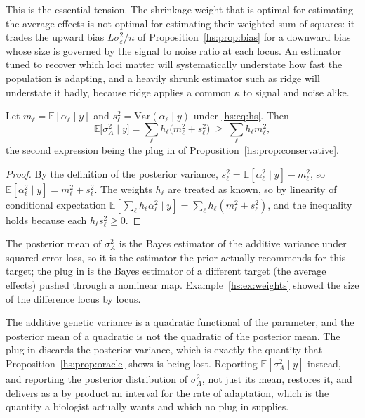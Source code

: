 This is the essential tension. The shrinkage weight that is optimal for estimating the average effects is not optimal for estimating their weighted sum of squares: it trades the upward bias $L\sigma^2_\varepsilon/n$ of Proposition~\ref{hs:prop:bias} for a downward bias whose size is governed by the signal to noise ratio at each locus. An estimator tuned to recover which loci matter will systematically understate how fast the population is adapting, and a heavily shrunk estimator such as ridge will understate it badly, because ridge applies a common $\kappa$ to signal and noise alike.

\begin{proposition}
\label{hs:prop:posterior}
Let $m_\ell = \mathbb{E}[\alpha_\ell\mid y]$ and $s^2_\ell = \mathrm{Var}(\alpha_\ell \mid y)$ under \eqref{hs:eq:hs}. Then
\[
\mathbb{E}\big[\sigma^2_A \mid y\big] = \sum_\ell h_\ell \big(m_\ell^2 + s^2_\ell\big)
\ \ge\ \sum_\ell h_\ell m_\ell^2 ,
\]
the second expression being the plug in of Proposition~\ref{hs:prop:conservative}.
\end{proposition}

\begin{proof}
By the definition of the posterior variance, $s^2_\ell = \mathbb{E}[\alpha_\ell^2\mid y] - m_\ell^2$, so $\mathbb{E}[\alpha_\ell^2\mid y] = m_\ell^2 + s_\ell^2$. The weights $h_\ell$ are treated as known, so by linearity of conditional expectation $\mathbb{E}[\sum_\ell h_\ell\alpha_\ell^2\mid y] = \sum_\ell h_\ell(m_\ell^2+s_\ell^2)$, and the inequality holds because each $h_\ell s^2_\ell \ge 0$.
\end{proof}

The posterior mean of $\sigma^2_A$ is the Bayes estimator of the additive variance under squared error loss, so it is the estimator the prior actually recommends for this target; the plug in is the Bayes estimator of a different target (the average effects) pushed through a nonlinear map. Example~\ref{hs:ex:weights} showed the size of the difference locus by locus.

The additive genetic variance is a quadratic functional of the parameter, and the posterior mean of a quadratic is not the quadratic of the posterior mean. The plug in discards the posterior variance, which is exactly the quantity that Proposition~\ref{hs:prop:oracle} shows is being lost. Reporting $\mathbb{E}[\sigma^2_A \mid y]$ instead, and reporting the posterior distribution of $\sigma^2_A$, not just its mean, restores it, and delivers as a by product an interval for the rate of adaptation, which is the quantity a biologist actually wants and which no plug in supplies.


